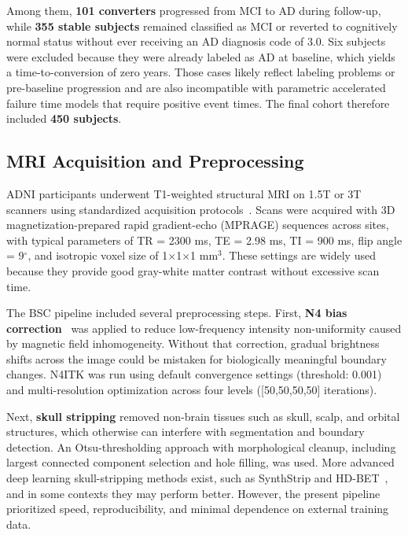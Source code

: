 \documentclass[blue]{ludusofficial}
\begin{document}
Among them, \textbf{101 converters} progressed from MCI to AD during follow-up, while \textbf{355 stable subjects} remained classified as MCI or reverted to cognitively normal status without ever receiving an AD diagnosis code of 3.0. Six subjects were excluded because they were already labeled as AD at baseline, which yields a time-to-conversion of zero years. Those cases likely reflect labeling problems or pre-baseline progression and are also incompatible with parametric accelerated failure time models that require positive event times. The final cohort therefore included \textbf{450 subjects}.

\subsection{MRI Acquisition and Preprocessing}

ADNI participants underwent T1-weighted structural MRI on 1.5T or 3T scanners using standardized acquisition protocols~\cite{jack2008adni_mri}. Scans were acquired with 3D magnetization-prepared rapid gradient-echo (MPRAGE) sequences across sites, with typical parameters of TR = 2300 ms, TE = 2.98 ms, TI = 900 ms, flip angle = 9$^\circ$, and isotropic voxel size of 1$\times$1$\times$1 mm$^3$. These settings are widely used because they provide good gray-white matter contrast without excessive scan time.

The BSC pipeline included several preprocessing steps. First, \textbf{N4 bias correction}~\cite{tustison2010n4} was applied to reduce low-frequency intensity non-uniformity caused by magnetic field inhomogeneity. Without that correction, gradual brightness shifts across the image could be mistaken for biologically meaningful boundary changes. N4ITK was run using default convergence settings (threshold: 0.001) and multi-resolution optimization across four levels ([50,50,50,50] iterations).

Next, \textbf{skull stripping} removed non-brain tissues such as skull, scalp, and orbital structures, which otherwise can interfere with segmentation and boundary detection. An Otsu-thresholding approach with morphological cleanup, including largest connected component selection and hole filling, was used. More advanced deep learning skull-stripping methods exist, such as SynthStrip and HD-BET~\cite{hoopes2022synthstrip}, and in some contexts they may perform better. However, the present pipeline prioritized speed, reproducibility, and minimal dependence on external training data.
\end{document}
